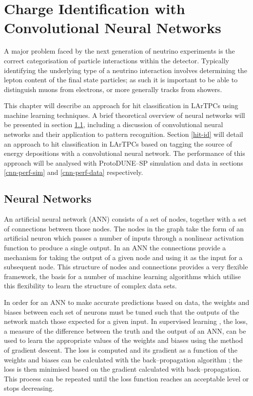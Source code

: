 \chapter{\label{ch:5-chargeid}Charge Identification with Convolutional Neural 
Networks} 


\noindent A major problem faced by the next generation of neutrino experiments
is the correct categorisation of particle interactions within the detector.
Typically identifying the underlying type of a neutrino interaction involves
determining the lepton content of the final state particles; as such it is
important to be able to distinguish muons from electrons, or more generally
tracks from showers.

This chapter will describe an approach for hit classification in LArTPCs using
machine learning techniques. A brief theoretical overview of neural networks
will be presented in section \ref{ml}, including a discussion of convolutional
neural networks and their application to pattern recognition. Section
\ref{hit-id} will detail an approach to hit classification in LArTPCs based on
tagging the source of energy depositions with a convolutional neural network.
The performance of this approach will be analysed with ProtoDUNE--SP simulation
and data in sections \ref{cnn-perf-sim} and \ref{cnn-perf-data} respectively.

\section{Neural Networks} \label{ml}

An artificial neural network (ANN) consists of a set of nodes, together with a
set of connections between those nodes. The nodes in the graph take the form of
an artificial neuron which passes a number of inputs through a nonlinear
activation function to produce a single output. In an ANN the connections
provide a mechanism for taking the output of a given node and using it as the
input for a subsequent node. This structure of nodes and connections provides a
very flexible framework, the basis for a number of machine learning algorithms
which utilise this flexibility to learn the structure of complex data sets.

In order for an ANN to make accurate predictions based on data, the weights and
biases between each set of neurons must be tuned such that the outputs of the
network match those expected for a given input. In supervised learning
\cite{Reed:1998:NSS:552600}, the loss, a measure of the difference between the
truth and the output of an ANN, can be used to learn the appropriate values of
the weights and biases using the method of gradient descent. The loss is
computed and its gradient as a function of the weights and biases can be
calculated with the back--propagation algorithm \cite{Rumelhart1986}; the loss
is then minimised based on the gradient calculated with back--propagation. This
process can be repeated until the loss function reaches an acceptable level or
stops decreasing.

